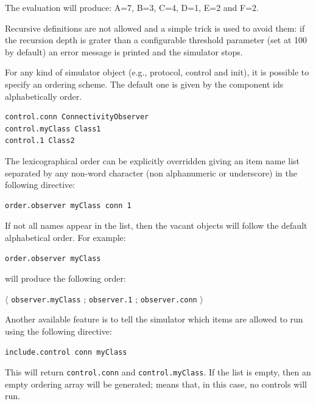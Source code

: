 \documentclass[a4paper,11pt]{article}
\begin{document}
The evaluation will produce: A=7, B=3, C=4, D=1, E=2 and F=2.

Recursive definitions are not allowed and a simple trick is used to 
avoid them: if the recursion depth is grater than a configurable 
threshold parameter (set at 100 by default) an error message is
printed and the simulator stops.

For any kind of simulator object (e.g., protocol, control and init),
it is possible to specify an ordering scheme. The default one is given
by the component ids
alphabetically order.

\begin{verbatim}
control.conn ConnectivityObserver
control.myClass Class1
control.1 Class2
\end{verbatim}

The lexicographical order can be explicitly overridden 
giving an item name list separated  by any non-word character
(non alphanumeric or underscore) in the following directive:

\begin{verbatim}
order.observer myClass conn 1
\end{verbatim}

If not all names appear in the list,
then the vacant objects will follow the default alphabetical order.
For example:

\begin{verbatim}
order.observer myClass
\end{verbatim}

will produce the following order:

\begin{center}
$\langle$ \texttt{observer.myClass} ; \texttt{observer.1} ;
\texttt{observer.conn} $\rangle$
 
\end{center}

Another available feature is to tell the simulator which items are
allowed to run using the following directive:

\begin{verbatim}
include.control conn myClass
\end{verbatim}

This will return \texttt{control.conn} and \texttt{control.myClass}.
If the list is empty, then an empty ordering array will be
generated; means that, in this case, no controls will run. 
\end{document}

